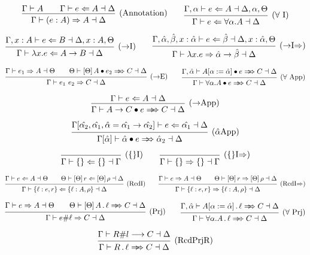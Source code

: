 \documentclass{article}
\renewcommand{\implies}{\Rightarrow}
\newcommand{\synthesizes}{\Rightarrow \!\!\! \Rightarrow}
\newcommand{\app}{\bullet}
\newcommand{\prjSymbol}{.}
\newcommand{\prj}{\,\prjSymbol\,}
\newcommand{\ev}{\hat}
\newcommand{\spc}{\qquad}
\newcommand{\apply}[1]{\left[#1\right]}
\newcommand{\synth}[4]{#1 \vdash #2 \Rightarrow #3 \dashv #4}
\renewcommand{\check}[4]{#1 \vdash #2 \Leftarrow #3 \dashv #4}
\newcommand{\presynth}[6]{#1 \vdash #2 #3 #4 \synthesizes #5 \dashv #6}
\newcommand{\lookup}[5]{#1 \vdash #2 \# #3 \longrightarrow #4 \dashv #5}
\newcommand{\deduct}[3][]
{
  \begin{prooftree}
    \hypo{#2}
    \infer1[\text{#1}]{#3}
  \end{prooftree}
}
\begin{document}
\[
  \deduct[(Annotation)]
  { \Gamma \vdash A \spc \check{\Gamma}{e}{A}{\Delta} }
  { \synth{\Gamma}{(e : A)}{A}{\Delta} }
  \spc
  \deduct[(\(\forall\) I)]
  { \check{\Gamma, \alpha}{e}{A}{\Delta, \alpha, \Theta} }
  { \check{\Gamma}{e}{\forall \alpha. A}{\Delta} }
\]

\[
  \deduct[(\(\to\)I)]
  { \check{\Gamma, x : A}{e}{B}{\Delta, x : A, \Theta} }
  { \check{\Gamma}{\lambda x. e}{A \to B}{\Delta} }
  \spc
  \deduct[(\(\to\)I\(\implies\))]
  { \check{\Gamma, \ev\alpha, \ev\beta, x : \ev\alpha}{e}{\ev\beta}{\Delta, x : \ev\alpha, \Theta} }
  { \synth{\Gamma}{\lambda x. e}{\ev\alpha \to \ev\beta}{\Delta} }
\]

\[
  \deduct[(\(\to\)E)]
  { \synth{\Gamma}{e_1}{A}{\Theta} \spc \presynth{\Theta}{\apply\Theta A}{\app}{e_2}{C}{\Delta} }
  { \synth{\Gamma}{e_1 \ e_2}{C}{\Delta}  }
  \spc
  \deduct[(\(\forall\) App)]
  { \presynth{\Gamma, \ev\alpha}{A[\alpha := \ev\alpha]}{\app}{e}{C}{\Delta} }
  { \presynth{\Gamma}{\forall \alpha. A}{\app}{e}{C}{\Delta} }
\]

\[
  \deduct[(\(\to\)App)]
    { \check{\Gamma}{e}{A}{\Delta} }
    { \presynth{\Gamma}{A \to C}{\app}{e}{C}{\Delta} }
\]

\[
  \deduct[(\(\ev\alpha\)App)]
    {
      \check{\Gamma[\ev{\alpha_2}, \ev{\alpha_1}, \ev \alpha = \ev{\alpha_1} \to
        \ev{\alpha_2}]}{e}{\ev{\alpha_1}}{\Delta}
    }
    { \presynth{\Gamma[\ev\alpha]}{\ev\alpha}{\app}{e}{\ev\alpha_2}{\Delta} }
\]


\[
\deduct[(\{\}I)]{}{\check{\Gamma}{\{\}}{\{\}}{\Gamma}}
\spc
\deduct[(\{\}I\(\implies\))]{}{\synth{\Gamma}{\{\}}{\{\}}{\Gamma}}
\]

\[
  \deduct[(RcdI)]
  { \check{\Gamma}{e}{A}{\Theta} \spc \check{\Theta}{\apply\Theta r}{\apply\Theta\rho}{\Delta} }
  { \check{\Gamma}{\{\ell : e , r \}}{\{\ell : A, \rho\}}{\Delta} }
  \spc
  \deduct[(RcdI\(\implies\))]
  { \synth{\Gamma}{e}{A}{\Theta} \spc \synth{\Theta}{\apply\Theta r}{\apply\Theta \rho}{\Delta} }
  { \synth{\Gamma}{\{\ell : e , r \}}{\{\ell : A, \rho\}}{\Delta} }
\]

\[
  \deduct[(Prj)]
  { \synth{\Gamma}{e}{A}{\Theta} \spc
    \presynth{\Theta}{\apply\Theta A}{\prj}{\ell}{C}{\Delta}
  }
  { \synth{\Gamma}{e\#\ell}{C}{\Delta} }
  \spc
  \deduct[(\(\forall\) Prj)]
  { \presynth{\Gamma, \ev\alpha}{A[\alpha := \ev\alpha]}{\prj}{\ell}{C}{\Delta} }
  { \presynth{\Gamma}{\forall \alpha. A}{\prj}{\ell}{C}{\Delta} }
\]

\[
  \deduct[(RcdPrjR)]
    { \lookup{\Gamma}{R}{l}{C}{\Delta} }
    { \presynth{\Gamma}{R}{\prj}{\ell}{C}{\Delta} }
\]
\end{document}
